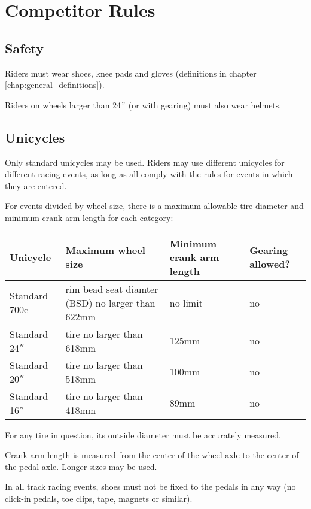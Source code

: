 \chapter{Competitor Rules}

\section{Safety}

Riders must wear shoes, knee pads and gloves (definitions in chapter \ref{chap:general_definitions}).

Riders on wheels larger than 24$"$ (or with gearing) must also wear helmets.

\section{Unicycles}

Only standard unicycles may be used.%
Riders may use different unicycles for different racing events, as long as all comply with the rules for events in which they are entered.

For events divided by wheel size, there is a maximum allowable tire diameter and minimum crank arm length for each category:

\begin{longtable}{|p{3cm}|p{5cm}|p{2cm}|p{2cm}|}
\hline
\textbf{Unicycle} & \textbf{Maximum wheel size} & \textbf{Minimum crank arm length} & \textbf{Gearing allowed?}\\
\hline
Standard 700c & rim bead seat diamter (BSD) 
no larger than 622mm & no limit & no \\
\hline
Standard 24$''$ & tire no larger than 618mm & 125mm & no \\
\hline
Standard 20$''$ & tire no larger than 518mm & 100mm & no \\
\hline
Standard 16$''$ & tire no larger than 418mm & 89mm & no \\
\hline
\end{longtable}

For any tire in question, its outside diameter must be accurately measured.

Crank arm length is measured from the center of the wheel axle to the center of the pedal axle.
Longer sizes may be used.

In all track racing events, shoes must not be fixed to the pedals in any way (no click-in pedals, toe clips, tape, magnets or similar).%

